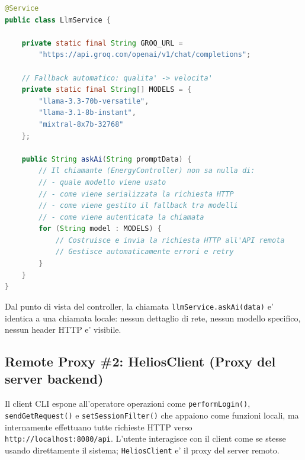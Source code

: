\documentclass[a4paper,12pt]{report}
\begin{document}
\begin{lstlisting}[language=Java, caption=LlmService come Remote Proxy del servizio AI]
@Service
public class LlmService {

    private static final String GROQ_URL =
        "https://api.groq.com/openai/v1/chat/completions";

    // Fallback automatico: qualita' -> velocita'
    private static final String[] MODELS = {
        "llama-3.3-70b-versatile",
        "llama-3.1-8b-instant",
        "mixtral-8x7b-32768"
    };

    public String askAi(String promptData) {
        // Il chiamante (EnergyController) non sa nulla di:
        // - quale modello viene usato
        // - come viene serializzata la richiesta HTTP
        // - come viene gestito il fallback tra modelli
        // - come viene autenticata la chiamata
        for (String model : MODELS) {
            // Costruisce e invia la richiesta HTTP all'API remota
            // Gestisce automaticamente errori e retry
        }
    }
}
\end{lstlisting}

Dal punto di vista del controller, la chiamata \texttt{llmService.askAi(data)} e' identica a una chiamata locale: nessun dettaglio di rete, nessun modello specifico, nessun header HTTP e' visibile.

\subsection{Remote Proxy \#2: HeliosClient (Proxy del server backend)}

Il client CLI espone all'operatore operazioni come \texttt{performLogin()}, \texttt{sendGetRequest()} e \texttt{setSessionFilter()} che appaiono come funzioni locali, ma internamente effettuano tutte richieste HTTP verso \texttt{http://localhost:8080/api}. L'utente interagisce con il client come se stesse usando direttamente il sistema; \texttt{HeliosClient} e' il proxy del server remoto.
\end{document}
